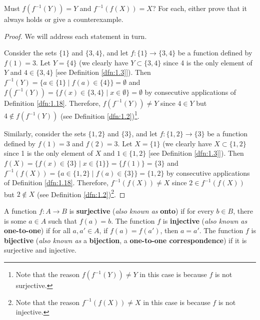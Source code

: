 \documentclass[../main.tex]{subfiles}
\begin{document}
\begin{exercise}\label{exr:1.19}
    Must $f(f^{-1}(Y))=Y$ and $f^{-1}(f(X))=X$? For each, either prove that it always holds or give a counterexample.
    \begin{proof}
        We will address each statement in turn.\par
        Consider the sets $\{1\}$ and $\{3,4\}$, and let $f:\{1\}\to\{3,4\}$ be a function defined by $f(1)=3$. Let $Y=\{4\}$ (we clearly have $Y\subset\{3,4\}$ since 4 is the only element of $Y$ and $4\in\{3,4\}$ [see Definition \ref{dfn:1.3}]). Then $f^{-1}(Y)=\{a\in\{1\}\mid f(a)\in\{4\}\}=\emptyset$ and $f(f^{-1}(Y))=\{f(x)\in\{3,4\}\mid x\in\emptyset\}=\emptyset$ by consecutive applications of Definition \ref{dfn:1.18}. Therefore, $f(f^{-1}(Y))\neq Y$ since $4\in Y$ but $4\notin f(f^{-1}(Y))$ (see Definition \ref{dfn:1.2})\footnote{Note that the reason $f(f^{-1}(Y))\neq Y$ in this case is because $f$ is not surjective.}.\par
        Similarly, consider the sets $\{1,2\}$ and $\{3\}$, and let $f:\{1,2\}\to\{3\}$ be a function defined by $f(1)=3$ and $f(2)=3$. Let $X=\{1\}$ (we clearly have $X\subset\{1,2\}$ since 1 is the only element of $X$ and $1\in\{1,2\}$ [see Definition \ref{dfn:1.3}]). Then $f(X)=\{f(x)\in\{3\}\mid x\in\{1\}\}=\{f(1)\}=\{3\}$ and $f^{-1}(f(X))=\{a\in\{1,2\}\mid f(a)\in\{3\}\}=\{1,2\}$ by consecutive applications of Definition \ref{dfn:1.18}. Therefore, $f^{-1}(f(X))\neq X$ since $2\in f^{-1}(f(X))$ but $2\notin X$ (see Definition \ref{dfn:1.2})\footnote{Note that the reason $f^{-1}(f(X))\neq X$ in this case is because $f$ is not injective.}.
    \end{proof}
\end{exercise}

\begin{definition}\label{dfn:1.20}
    A function $f:A\to B$ is \textbf{surjective} (\emph{also known as} \textbf{onto}) if for every $b\in B$, there is some $a\in A$ such that $f(a)=b$. The function $f$ is \textbf{injective} (\emph{also known as} \textbf{one-to-one}) if for all $a,a'\in A$, if $f(a)=f(a')$, then $a=a'$. The function $f$ is \textbf{bijective} (\emph{also known as} a \textbf{bijection}, a \textbf{one-to-one correspondence}) if it is surjective and injective.
\end{definition}
\end{document}
